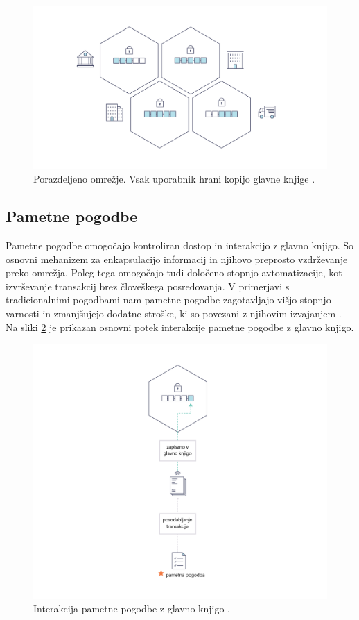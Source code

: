 \documentclass[a4paper, 12pt]{book}
\begin{document}
\begin{figure}[h]
	\includegraphics[width=1.0\textwidth]{slike/basic_network.png}
	\caption{Porazdeljeno omrežje. Vsak uporabnik hrani kopijo glavne knjige \cite{hyperledgerDocs}.}
	\label{hyperledger_basic_network}
\end{figure}

\subsection{Pametne pogodbe}
Pametne pogodbe omogočajo kontroliran dostop in interakcijo z glavno knjigo.
So osnovni mehanizem za enkapsulacijo informacij in njihovo preprosto vzdrže\-vanje preko omrežja.
Poleg tega omogočajo tudi določeno stopnjo avtomatizacije, kot izvrševanje transakcij brez človeškega posredovanja.
V primerjavi s tradicionalnimi pogodbami nam pametne pogodbe zagotavljajo višjo stopnjo varnosti in zmanjšujejo dodatne stroške, ki so povezani z njihovim izvajanjem \cite{atzei2017survey}.
Na sliki \ref{smart_contract} je prikazan osnovni potek interakcije pametne pogodbe z glavno knjigo.

\begin{figure}[h]
	\includegraphics[width=1.0\textwidth]{slike/Smart_Contract_sl.png}
	\caption{Interakcija pametne pogodbe z glavno knjigo \cite{hyperledgerDocs}.}
	\label{smart_contract}
\end{figure}
\end{document}

